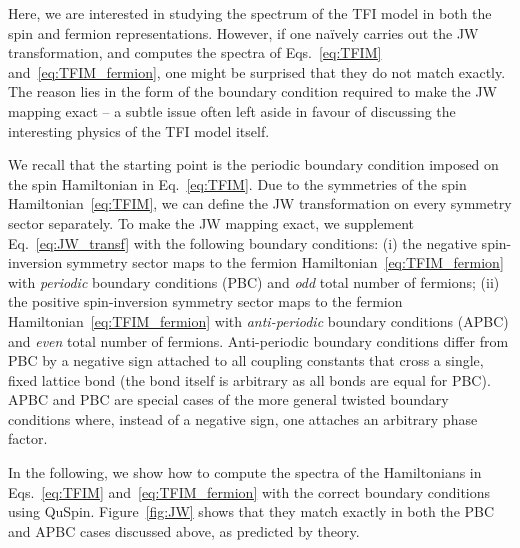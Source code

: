 \documentclass{SciPost}
\newcommand\0{\scalebox{-1}[1]{0}}
\begin{document}
Here, we are interested in studying the spectrum of the TFI model in both the spin and fermion representations. However, if one na\"ively carries out the JW transformation, and computes the spectra of Eqs.~\eqref{eq:TFIM} and~\eqref{eq:TFIM_fermion}, one might be surprised that they do not match exactly. The reason lies in the form of the boundary condition required to make the JW mapping exact -- a subtle issue often left aside in favour of discussing the interesting physics of the TFI model itself. 

We recall that the starting point is the periodic boundary condition imposed on the spin Hamiltonian in Eq.~\eqref{eq:TFIM}. Due to the symmetries of the spin Hamiltonian~\eqref{eq:TFIM}, we can define the JW transformation on every symmetry sector separately. To make the JW mapping exact, we supplement Eq.~\eqref{eq:JW_transf} with the following boundary conditions: (i) the negative spin-inversion symmetry sector maps to the fermion Hamiltonian~\eqref{eq:TFIM_fermion} with \emph{periodic} boundary conditions (PBC) and \emph{odd} total number of fermions; (ii) the positive spin-inversion symmetry sector maps to the fermion Hamiltonian~\eqref{eq:TFIM_fermion} with \emph{anti-periodic} boundary conditions (APBC) and \emph{even} total number of fermions. Anti-periodic boundary conditions differ from PBC by a negative sign attached to all coupling constants that cross a single, fixed lattice bond (the bond itself is arbitrary as all bonds are equal for PBC). APBC and PBC are special cases of the more general twisted boundary conditions where, instead of a negative sign, one attaches an arbitrary phase factor.

In the following, we show how to compute the spectra of the Hamiltonians in Eqs.~\eqref{eq:TFIM} and~\eqref{eq:TFIM_fermion} with the correct boundary conditions using QuSpin. Figure~\ref{fig:JW} shows that they match exactly in both the PBC and APBC cases discussed above, as predicted by theory.
\end{document}
